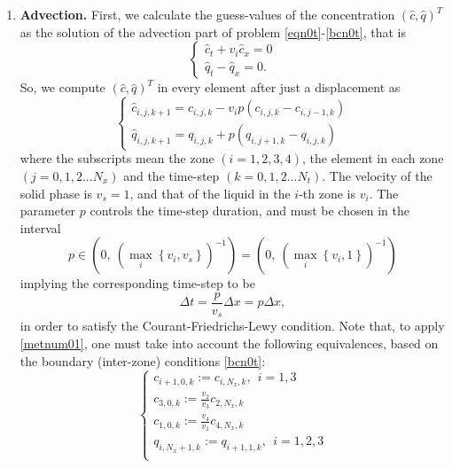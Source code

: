 \documentclass[a4paper]{article}
\numberwithin{equation}{section}
\begin{document}
\begin{enumerate}
\item \textbf{Advection.} First, we calculate the guess-values of the concentration $(\hat{c}, \hat{q})^T$ as the solution of the advection part of problem \eqref{eqn0t}-\eqref{bcn0t}, that is
    \begin{equation*}
    \begin{cases}
        \hat{c}_t+v_i \hat{c}_x=0 \\
        \hat{q}_t-\hat{q}_x=0.
    \end{cases}
    \end{equation*}
    So, we compute $(\hat{c}, \hat{q})^T$ in every element after just a displacement %
    as
    \begin{equation}\label{metnum01}
    \begin{cases}
        \hat{c}_{i,j,k+1}=c_{i,j,k} -v_i p\left(c_{i,j,k}-c_{i,j-1,k}\right) \\
        \hat{q}_{i,j,k+1}=q_{i,j,k} + p\left(q_{i,j+1,k}-q_{i,j,k}\right)
    \end{cases}
    \end{equation}
where the subscripts mean the zone $(i=1,2,3,4)$, the element in each zone $(j=0,1,2 ... N_x)$ and the time-step $(k=0,1,2...N_t)$. The velocity of the solid phase is $v_s=1$, and that of the liquid in the $i$-th zone is $v_i$. The parameter $p$ controls the time-step duration, and must be chosen in the interval
\begin{equation*}%
p\in \left(0,\ (\max_i\left\{v_i,v_{s}\right\})^{-1}\right)=\left(0,\ (\max_i\left\{v_i,1\right\})^{-1}\right)
\end{equation*}
implying the corresponding time-step to be
\begin{equation*}%
\Delta t=\frac{p}{v_s} \Delta x =p \Delta x,
\end{equation*}
in order to satisfy the Courant-Friedrichs-Lewy condition.
Note that, to apply \eqref{metnum01}, one must take into account the following equivalences, based on the boundary (inter-zone) conditions \eqref{bcn0t}:
\begin{equation*}%
\begin{cases}c_{i+1,0,k}:=c_{i,N_x,k},\ \  i=1,3 \\
c_{3,0,k}:=\frac{v_2}{v_3} c_{2,N_x,k}\\
c_{1,0,k}:= \frac{v_4}{v_1} c_{4,N_x,k} \\
q_{i,N_x+1,k}:=q_{i+1,1,k},\ \  i=1,2,3 \\

\end{cases}
\end{equation*}
\end{enumerate}
\end{document}
